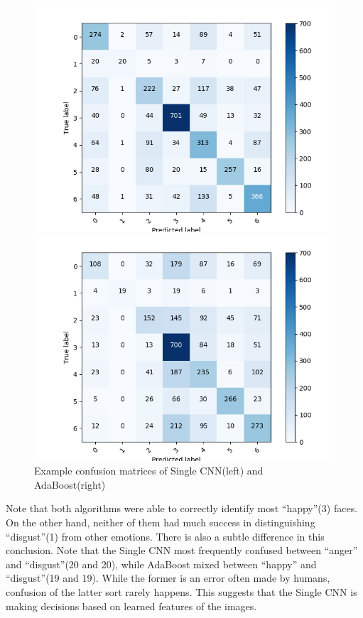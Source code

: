 \documentclass[11pt]{article}
\begin{document}
\begin{figure}[!htbp]
  \centering
  \begin{minipage}[b]{0.48\textwidth}
    \includegraphics[width=\textwidth]{confusion_conv}

  \end{minipage}
  \hfill
  \begin{minipage}[b]{0.48\textwidth}
    \includegraphics[width=\textwidth]{confusion_ada}

  \end{minipage}
    \hfill
   \caption{Example confusion matrices of Single CNN(left) and AdaBoost(right)}
\end{figure}

Note that both algorithms were able to correctly identify most ``happy''(3) faces. On the other hand, neither of them had much success in distinguishing ``disgust''(1) from other emotions. There is also a subtle difference in this conclusion. Note that the Single CNN most frequently confused between ``anger'' and ``disgust''(20 and 20), while AdaBoost mixed between ``happy'' and ``disgust''(19 and 19). While the former is an error often made by humans, confusion of the latter sort rarely happens. This suggests that the Single CNN is making decisions based on learned features of the images.
\end{document}
